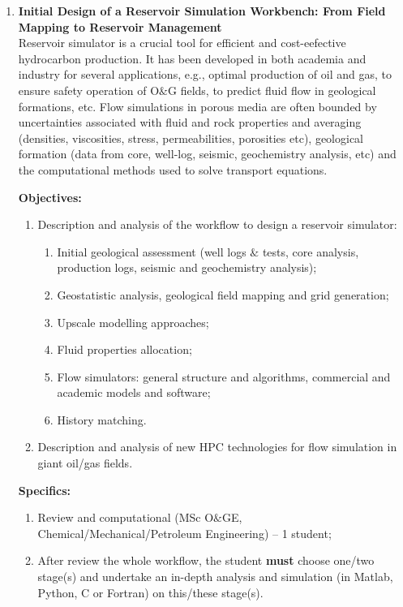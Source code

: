 \documentclass[12pts,a4paper,amsmath,amssymb,floatfix]{article}%
\newcommand{\all}{MSc O$\&$GE, Chemical/Mechanical/Petroleum Engineering}
\begin{document}

\begin{enumerate}[label=\bfseries Project: \arabic*:]


\item {\bf Initial Design of a Reservoir Simulation Workbench: From Field Mapping to Reservoir Management}\\
Reservoir simulator is a crucial tool for efficient and cost-eefective hydrocarbon production. It has been developed in both academia and industry for several applications, e.g., optimal production of oil and gas, to ensure safety operation of O$\&$G fields, to predict fluid flow in geological formations, etc. Flow simulations in porous media are often bounded by uncertainties associated with fluid and rock properties and averaging (densities, viscosities, stress, permeabilities, porosities etc), geological formation (data from core, well-log, seismic, geochemistry analysis, etc) and the computational methods used to solve transport equations. 

\noindent
{\bf Objectives:}
\begin{enumerate}
\item Description and analysis of the workflow to design a reservoir simulator:
\begin{enumerate}
\item Initial geological assessment (well logs $\&$ tests, core analysis, production logs, seismic and geochemistry analysis);
\item Geostatistic analysis, geological field mapping and grid generation;
\item Upscale modelling approaches;
\item Fluid properties allocation;
\item Flow simulators: general structure and algorithms, commercial and academic models and software;
\item History matching.
\end{enumerate}
\item Description and analysis of new HPC technologies for flow simulation in giant oil/gas fields.
\end{enumerate}

\noindent
{\bf Specifics:} 
\begin{enumerate}
\item Review and computational (\all) -- 1 student;
\item After review the whole workflow, the student {\bf must} choose one/two stage(s) and undertake an in-depth analysis and simulation (in Matlab, Python, C or Fortran) on this/these stage(s).
\end{enumerate}


\end{enumerate}
\end{document}
